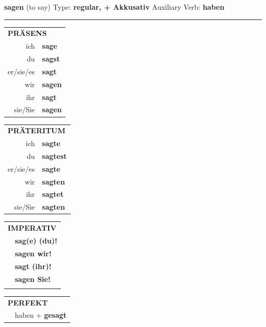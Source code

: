 \documentclass[10pt,a4paper]{revtex4-2}
\begin{document}
\begin{verbbox-acc}
    {\Large \bf sagen} (to say) \hfill Type: \textbf{regular, + Akkusativ} \hfill Auxiliary Verb: \textbf{haben} 
    
     \vspace{5pt}

    \hrule
    
    \vspace{5pt}

  \begin{tabular}{rl}
     \multicolumn{2}{l}{\textbf{PRÄSENS} }\\
    ich & \textbf{sage}\\
    du & \textbf{sagst}\\
    er/sie/es & \textbf{sagt}\\
    wir & \textbf{sagen}\\
    ihr & \textbf{sagt}\\
    sie/Sie & \textbf{sagen}\\
  \end{tabular}
  \hfill
     \begin{tabular}{rl}
    \multicolumn{2}{l}{\textbf{PRÄTERITUM} }\\
    ich & \textbf{sagte}\\
    du & \textbf{sagtest}\\
    er/sie/es & \textbf{sagte}\\
    wir & \textbf{sagten}\\
    ihr & \textbf{sagtet}\\
    sie/Sie & \textbf{sagten}\\
  \end{tabular}
  \hfill
  \begin{tabular}{rl}
     \multicolumn{2}{l}{\textbf{IMPERATIV} }\\
   & \textbf{sag(e) (du)!}\\
   & \textbf{sagen wir!}\\
   & \textbf{sagt (ihr)!}\\
   & \textbf{sagen Sie!}\\
   & \vspace{10pt}
  \end{tabular}

    \vspace{10pt}

 \begin{tabular}{rl}
     \multicolumn{2}{l}{\textbf{PERFEKT}}\\
   & haben + \textbf{gesagt}\\
  \end{tabular}
\hfill
   \begin{tabular}{rl}
   

\end{tabular}
\end{verbbox-acc}
\end{document}
